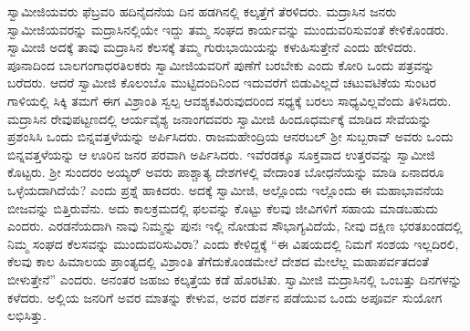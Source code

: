  ಸ್ವಾಮೀಜಿಯವರು ಫೆಬ್ರವರಿ ಹದಿನೈದನೆಯ ದಿನ ಹಡಗಿನಲ್ಲಿ ಕಲ್ಕತ್ತೆಗೆ ತೆರಳಿದರು. ಮದ್ರಾಸಿನ ಜನರು ಸ್ವಾಮೀಜಿಯವರನ್ನು ಮದ್ರಾಸಿನಲ್ಲಿಯೇ ಇದ್ದು ತಮ್ಮ ಸಂಘದ ಕಾರ್ಯವನ್ನು ಮುಂದುವರಿಸುವಂತೆ ಕೇಳಿಕೊಂಡರು. ಸ್ವಾಮೀಜಿ ಅದಕ್ಕೆ ತಾವು ಮದ್ರಾಸಿನ ಕೆಲಸಕ್ಕೆ ತಮ್ಮ ಗುರುಭಾಯಿಯನ್ನು ಕಳುಹಿಸುತ್ತೇನೆ ಎಂದು ಹೇಳಿದರು. ಪೂನಾದಿಂದ ಬಾಲಗಂಗಾಧರತಿಲಕರು ಸ್ವಾಮೀಜಿಯವರಿಗೆ ಪುಣೆಗೆ ಬರಬೇಕು ಎಂದು ಕೋರಿ ಒಂದು ಪತ್ರವನ್ನು ಬರೆದರು. ಆದರೆ ಸ್ವಾಮೀಜಿ ಕೊಲಂಬೊ ಮುಟ್ಟಿದಂದಿನಿಂದ ಇದುವರೆಗೆ ಬಿಡುವಿಲ್ಲದೆ ಚಟುವಟಿಕೆಯ ಸುಂಟರ ಗಾಳಿಯಲ್ಲಿ ಸಿಕ್ಕಿ ತಮಗೆ ಈಗ ವಿಶ್ರಾಂತಿ ಸ್ವಲ್ಪ ಆವಶ್ಯಕವಿರುವುದರಿಂದ ಸಧ್ಯಕ್ಕೆ ಬರಲು ಸಾಧ್ಯವಿಲ್ಲವೆಂದು ತಿಳಿಸಿದರು. ಮದ್ರಾಸಿನ ರೇವುಪಟ್ಟಣದಲ್ಲಿ ಆರ್ಯವೈಶ್ಯ ಜನಾಂಗದವರು ಸ್ವಾಮೀಜಿ ಹಿಂದೂಧರ್ಮಕ್ಕೆ ಮಾಡಿದ ಸೇವೆಯನ್ನು ಪ್ರಶಂಸಿಸಿ ಒಂದು ಬಿನ್ನವತ್ತಳೆಯನ್ನು ಅರ್ಪಿಸಿದರು. ರಾಜಮಹೇಂದ್ರಿಯ ಆನರಬಲ್ ಶ‍್ರೀ ಸುಬ್ಬರಾವ್ ಅವರು ಒಂದು ಬಿನ್ನವತ್ತಳೆಯನ್ನು ಆ ಊರಿನ ಜನರ ಪರವಾಗಿ ಅರ್ಪಿಸಿದರು. ಇವೆರಡಕ್ಕೂ ಸೂಕ್ತವಾದ ಉತ್ತರವನ್ನು ಸ್ವಾಮೀಜಿ ಕೊಟ್ಟರು. ಶ‍್ರೀ ಸುಂದರಂ ಅಯ್ಯರ್ ಅವರು ಪಾಶ್ಚಾತ್ಯ ದೇಶಗಳಲ್ಲಿ ವೇದಾಂತ ಬೋಧನೆಯನ್ನು ಮಾಡಿ ಏನಾದರೂ ಒಳ್ಳೆಯದಾಗಿದೆಯೆ? ಎಂದು ಪ್ರಶ್ನೆ ಹಾಕಿದರು. ಅದಕ್ಕೆ ಸ್ವಾಮೀಜಿ, ಅಲ್ಲೊಂದು ಇಲ್ಲೊಂದು ಈ ಮಹಾಭಾವನೆಯ ಬೀಜವನ್ನು ಬಿತ್ತಿರುವೆನು. ಅದು ಕಾಲಕ್ರಮದಲ್ಲಿ ಫಲವನ್ನು ಕೊಟ್ಟು ಕೆಲವು ಜೀವಿಗಳಿಗೆ ಸಹಾಯ ಮಾಡಬಹುದು ಎಂದರು. ಎರಡನೆಯದಾಗಿ ನಾವು ನಿಮ್ಮನ್ನು ಪುನಃ ಇಲ್ಲಿ ನೋಡುವ ಸೌಭಾಗ್ಯವಿದೆಯೆ, ನೀವು ದಕ್ಷಿಣ ಭರತಖಂಡದಲ್ಲಿ ನಿಮ್ಮ ಸಂಘದ ಕೆಲಸವನ್ನು ಮುಂದುವರಿಸುವಿರಾ? ಎಂದು ಕೇಳಿದ್ದಕ್ಕೆ “ಈ ವಿಷಯದಲ್ಲಿ ನಿಮಗೆ ಸಂಶಯ ಇಲ್ಲದಿರಲಿ, ಕೆಲವು ಕಾಲ ಹಿಮಾಲಯ ಪ್ರಾಂತ್ಯದಲ್ಲಿ ವಿಶ್ರಾಂತಿ ತೆಗೆದುಕೊಂಡಮೇಲೆ ದೇಶದ ಮೇಲೆಲ್ಲ ಮಹಾಪರ್ವತದಂತೆ ಬೀಳುತ್ತೇನೆ” ಎಂದರು. ಅನಂತರ ಜಹಜು ಕಲ್ಕತ್ತೆಯ ಕಡೆ ಹೊರಟಿತು. ಸ್ವಾಮೀಜಿ ಮದ್ರಾಸಿನಲ್ಲಿ ಒಂಬತ್ತು ದಿನಗಳನ್ನು ಕಳೆದರು. ಅಲ್ಲಿಯ ಜನರಿಗೆ ಅವರ ಮಾತನ್ನು ಕೇಳುವ, ಅವರ ದರ್ಶನ ಪಡೆಯುವ ಒಂದು ಅಪೂರ್ವ ಸುಯೋಗ ಲಭಿಸಿತ್ತು. 

